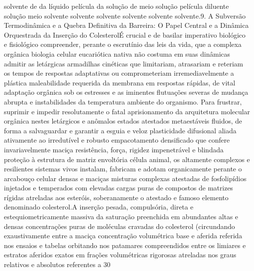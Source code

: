 solvente de da líquido película da solução de meio solução película diluente solução meio solvente solvente solvente solvente solvente solvente.9. A Subversão Termodinâmica e a Quebra Definitiva da Barreira: O Papel Central e a Dinâmica Orquestrada da Inserção do ColesterolÉ crucial e de basilar imperativo biológico e fisiológico compreender, perante o escrutínio das leis da vida, que a complexa orgânica biologia celular eucariótica nativa não costuma em suas dinâmicas admitir as letárgicas armadilhas cinéticas que limitariam, atrasariam e reteriam os tempos de respostas adaptativas ou comprometeriam irremediavelmente a plástica maleabilidade requerida da membrana em respostas rápidas, de vital adaptação orgânica sob os estresses e as iminentes flutuações severas de mudança abrupta e instabilidades da temperatura ambiente do organismo. Para frustrar, suprimir e impedir resolutamente o fatal aprisionamento da arquitetura molecular orgânica nestes letárgicos e anômalos estados atestados metaestáveis fluidos, de forma a salvaguardar e garantir a esguia e veloz plasticidade difusional aliada ativamente ao irredutível e robusto empacotamento densificado que confere invariavelmente maciça resistência, força, rigidez impenetrável e blindada proteção à estrutura de matriz envoltória célula animal, os altamente complexos e resilientes sistemas vivos instalam, fabricam e adotam organicamente perante o arcabouço celular densas e maciças misturas complexas atestadas de fosfolipídios injetados e temperados com elevadas cargas puras de compostos de matrizes rígidas atreladas aos esteróis, soberanamente o atestado e famoso elemento denominado colesterol.A inserção pesada, compulsória, direta e estequiometricamente massiva da saturação preenchida em abundantes altas e densas concentrações puras de moléculas cravadas do colesterol (circundando exaustivamente entre a maciça concentração volumétrica base e aferida referida nos ensaios e tabelas orbitando nos patamares compreendidos entre os limiares e estratos aferidos exatos em frações volumétricas rigorosas atreladas nos graus relativos e absolutos referentes a 30%